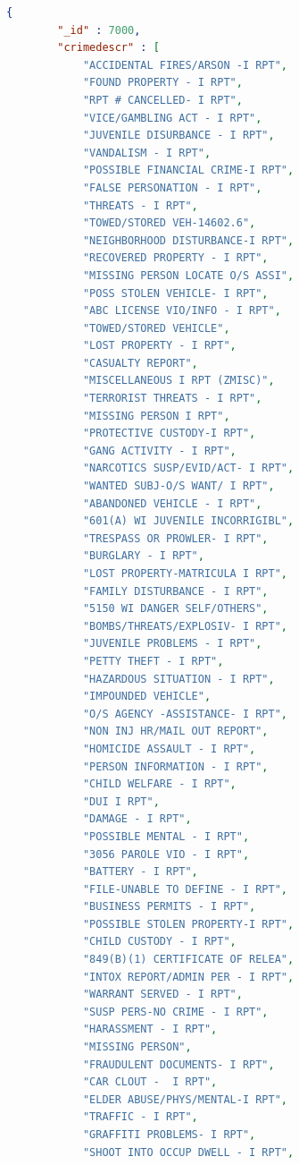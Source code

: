 \documentclass{article}
\begin{document}
\begin{lstlisting}[language=JSON]
    {
        "_id" : 7000,
        "crimedescr" : [
            "ACCIDENTAL FIRES/ARSON -I RPT",
            "FOUND PROPERTY - I RPT",
            "RPT # CANCELLED- I RPT",
            "VICE/GAMBLING ACT - I RPT",
            "JUVENILE DISURBANCE - I RPT",
            "VANDALISM - I RPT",
            "POSSIBLE FINANCIAL CRIME-I RPT",
            "FALSE PERSONATION - I RPT",
            "THREATS - I RPT",
            "TOWED/STORED VEH-14602.6",
            "NEIGHBORHOOD DISTURBANCE-I RPT",
            "RECOVERED PROPERTY - I RPT",
            "MISSING PERSON LOCATE O/S ASSI",
            "POSS STOLEN VEHICLE- I RPT",
            "ABC LICENSE VIO/INFO - I RPT",
            "TOWED/STORED VEHICLE",
            "LOST PROPERTY - I RPT",
            "CASUALTY REPORT",
            "MISCELLANEOUS I RPT (ZMISC)",
            "TERRORIST THREATS - I RPT",
            "MISSING PERSON I RPT",
            "PROTECTIVE CUSTODY-I RPT",
            "GANG ACTIVITY - I RPT",
            "NARCOTICS SUSP/EVID/ACT- I RPT",
            "WANTED SUBJ-O/S WANT/ I RPT",
            "ABANDONED VEHICLE - I RPT",
            "601(A) WI JUVENILE INCORRIGIBL",
            "TRESPASS OR PROWLER- I RPT",
            "BURGLARY - I RPT",
            "LOST PROPERTY-MATRICULA I RPT",
            "FAMILY DISTURBANCE - I RPT",
            "5150 WI DANGER SELF/OTHERS",
            "BOMBS/THREATS/EXPLOSIV- I RPT",
            "JUVENILE PROBLEMS - I RPT",
            "PETTY THEFT - I RPT",
            "HAZARDOUS SITUATION - I RPT",
            "IMPOUNDED VEHICLE",
            "O/S AGENCY -ASSISTANCE- I RPT",
            "NON INJ HR/MAIL OUT REPORT",
            "HOMICIDE ASSAULT - I RPT",
            "PERSON INFORMATION - I RPT",
            "CHILD WELFARE - I RPT",
            "DUI I RPT",
            "DAMAGE - I RPT",
            "POSSIBLE MENTAL - I RPT",
            "3056 PAROLE VIO - I RPT",
            "BATTERY - I RPT",
            "FILE-UNABLE TO DEFINE - I RPT",
            "BUSINESS PERMITS - I RPT",
            "POSSIBLE STOLEN PROPERTY-I RPT",
            "CHILD CUSTODY - I RPT",
            "849(B)(1) CERTIFICATE OF RELEA",
            "INTOX REPORT/ADMIN PER - I RPT",
            "WARRANT SERVED - I RPT",
            "SUSP PERS-NO CRIME - I RPT",
            "HARASSMENT - I RPT",
            "MISSING PERSON",
            "FRAUDULENT DOCUMENTS- I RPT",
            "CAR CLOUT -  I RPT",
            "ELDER ABUSE/PHYS/MENTAL-I RPT",
            "TRAFFIC - I RPT",
            "GRAFFITI PROBLEMS- I RPT",
            "SHOOT INTO OCCUP DWELL - I RPT",

\end{lstlisting}
\end{document}
